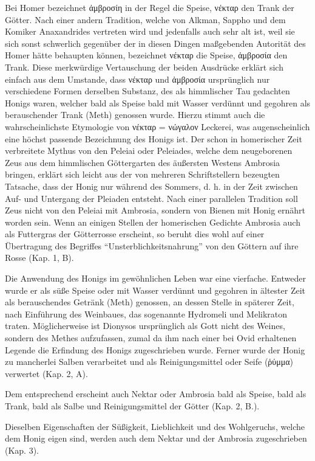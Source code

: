 \documentclass[a4paper, 11pt, oneside]{article}
\begin{document}
Bei Homer bezeichnet ἀμβροσίη in der Regel die Speise, νέκταρ den Trank der Götter. Nach einer andern Tradition, welche von Alkman, Sappho und dem Komiker Anaxandrides vertreten wird und jedenfalls auch sehr alt ist, weil sie sich sonst schwerlich gegenüber der in diesen Dingen maßgebenden Autorität des Homer hätte behaupten können, bezeichnet νέκταρ die Speise, ἀμβροσία den Trank. Diese merkwürdige Vertauschung der beiden Ausdrücke erklärt sich einfach aus dem Umstande, dass νέκταρ und ἀμβροσία ursprünglich nur verschiedene Formen derselben Substanz, des als himmlischer Tau gedachten Honigs waren, welcher bald als Speise bald mit Wasser verdünnt und gegohren als berauschender Trank (Meth) genossen wurde. Hierzu stimmt auch die wahrscheinlichste Etymologie von νέκταρ = νώγαλον Leckerei, was augenscheinlich eine höchst passende Bezeichnung des Honigs ist. Der schon in homerischer Zeit verbreitete Mythus von den Peleiai oder Peleiades, welche dem neugeborenen Zeus aus dem himmlischen Göttergarten des äußersten Westens Ambrosia bringen, erklärt sich leicht aus der von mehreren Schriftstellern bezeugten Tatsache, dass der Honig nur während des Sommers, d. h. in der Zeit zwischen Auf- und Untergang der Pleiaden entsteht. Nach einer parallelen Tradition soll Zeus nicht von den Peleiai mit Ambrosia, sondern von Bienen mit Honig ernährt worden sein. Wenn an einigen Stellen der homerischen Gedichte Ambrosia auch als Futtergras der Götterrosse erscheint, so beruht dies wohl auf einer Übertragung des Begriffes "`Unsterblichkeitsnahrung"' von den Göttern auf ihre Rosse (Kap. 1, B).

Die Anwendung des Honigs im gewöhnlichen Leben war eine vierfache. Entweder wurde er als süße Speise oder mit Wasser verdünnt und gegohren in ältester Zeit als berauschendes Getränk (Meth) genossen, an dessen Stelle in späterer Zeit, nach Einführung des Weinbaues, das sogenannte Hydromeli und Melikraton traten. Möglicherweise ist Dionysos ursprünglich als Gott nicht des Weines, sondern des Methes aufzufassen, zumal da ihm nach einer bei Ovid erhaltenen Legende die Erfindung des Honigs zugeschrieben wurde. Ferner wurde der Honig zu mancherlei Salben verarbeitet und als Reinigungsmittel oder Seife (ῥύμμα) verwertet (Kap. 2, A).

Dem entsprechend erscheint auch Nektar oder Ambrosia bald als Speise, bald als Trank, bald als Salbe und Reinigungsmittel der Götter (Kap. 2, B.).

Dieselben Eigenschaften der Süßigkeit, Lieblichkeit und des Wohlgeruchs, welche dem Honig eigen sind, werden auch dem Nektar und der Ambrosia zugeschrieben (Kap. 3).
\end{document}
